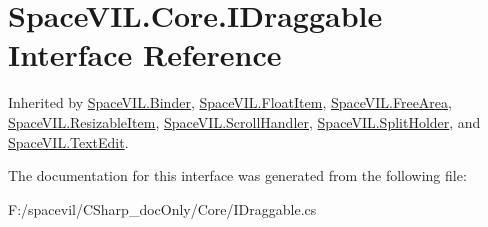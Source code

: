 \hypertarget{interface_space_v_i_l_1_1_core_1_1_i_draggable}{}\section{Space\+V\+I\+L.\+Core.\+I\+Draggable Interface Reference}
\label{interface_space_v_i_l_1_1_core_1_1_i_draggable}


Inherited by \mbox{\hyperlink{class_space_v_i_l_1_1_binder}{Space\+V\+I\+L.\+Binder}}, \mbox{\hyperlink{class_space_v_i_l_1_1_float_item}{Space\+V\+I\+L.\+Float\+Item}}, \mbox{\hyperlink{class_space_v_i_l_1_1_free_area}{Space\+V\+I\+L.\+Free\+Area}}, \mbox{\hyperlink{class_space_v_i_l_1_1_resizable_item}{Space\+V\+I\+L.\+Resizable\+Item}}, \mbox{\hyperlink{class_space_v_i_l_1_1_scroll_handler}{Space\+V\+I\+L.\+Scroll\+Handler}}, \mbox{\hyperlink{class_space_v_i_l_1_1_split_holder}{Space\+V\+I\+L.\+Split\+Holder}}, and \mbox{\hyperlink{class_space_v_i_l_1_1_text_edit}{Space\+V\+I\+L.\+Text\+Edit}}.



The documentation for this interface was generated from the following file\+:\begin{DoxyCompactItemize}
\item 
F\+:/spacevil/\+C\+Sharp\+\_\+doc\+Only/\+Core/I\+Draggable.\+cs\end{DoxyCompactItemize}
